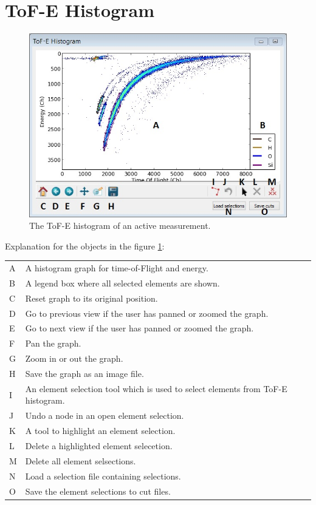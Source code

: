 \documentclass{scrreprt}
\begin{document}
\section{ToF-E Histogram}\label{measurementtab-tofe}
\begin{figure}[H]
\centering
\includegraphics[width=140mm]{measurement-tofe}
\caption{The ToF-E histogram of an active measurement.}
\label{fig-tofe}
\end{figure}
Explanation for the objects in the figure \ref{fig-tofe}:

\begin{tabular}{ll}
A & A histogram graph for time-of-Flight and energy.\\
B & A legend box where all selected elements are shown.\\
C & Reset graph to its original position.\\
D & Go to previous view if the user has panned or zoomed the graph.\\
E & Go to next view if the user has panned or zoomed the graph.\\
F & Pan the graph.\\
G & Zoom in or out the graph.\\
H & Save the graph as an image file.\\
I & An element selection tool which is used to select elements from ToF-E histogram.\\
J & Undo a node in an open element selection.\\
K & A tool to highlight an element selection.\\
L & Delete a highlighted element selecetion.\\
M & Delete all element selsections.\\
N & Load a selection file containing selections.\\
O & Save the element selections to cut files.\\
\end{tabular}
\end{document}
